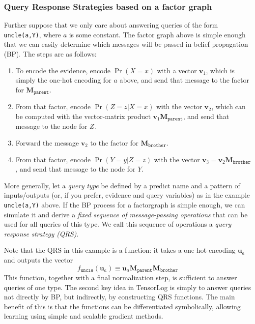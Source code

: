 \documentclass[12pt]{article}
\newcommand{\vek}[1]{\textbf{#1}}
\newcommand{\M}{\textbf{M}}
\begin{document}
\subsubsection{Query Response Strategies based on a factor graph}

Further suppose that we only care about answering queries of the form
\texttt{uncle(a,Y)}, where $a$ is some constant.  The factor graph
above is simple enough that we can easily determine which messages
will be passed in belief propagation (BP). The steps are as follows:
\begin{enumerate}
\item To encode the evidence, encode $\Pr(X=x)$ with a vector
  $\vek{v}_1$, which is simply the one-hot encoding for $a$ above,
  and send that message to the factor for $\M_\texttt{parent}$.
\item From that factor, encode $\Pr(Z=z|X=x)$ with the vector
  $\vek{v}_2$, which can be computed with the vector-matrix product
  $\vek{v}_1 \M_\texttt{parent}$, and send that message to the node for
  $Z$.
\item Forward the message $\vek{v}_2$ to the factor for $\M_\texttt{brother}$.
\item From that factor, encode $\Pr(Y=y|Z=z)$ with the vector
  $\vek{v}_3 = \vek{v}_2 \M_\texttt{brother}$, and send that message to
  the node for $Y$.
\end{enumerate}

More generally, let a \textit{query type} be defined by a predict name
and a pattern of inputs/outputs (or, if you prefer, evidence and query
variables) as in the example \texttt{uncle(a,Y)} above.  If the BP
process for a factorgraph is simple enough, we can simulate it and
derive a \emph{fixed sequence of message-passing operations} that can
be used for all queries of this type.  We call this sequence of
operations a \textit{query response strategy (QRS)}.  

Note that the QRS in this example is a function: it takes
a one-hot encoding $\vek{u}_a$ and outputs the vector
\[ f_\texttt{uncle}(\vek{u}_a) \equiv \vek{u}_a \M_\texttt{parent} \M_\texttt{brother}
\]
This function, together with a final normalization step, is sufficient
to answer queries of one type. The second key idea in TensorLog is
simply to answer queries not directly by BP, but indirectly, by
constructing QRS functions.  The main benefit of this is that the
functions can be differentiated symbolically, allowing learning using
simple and scalable gradient methods.
\end{document}
